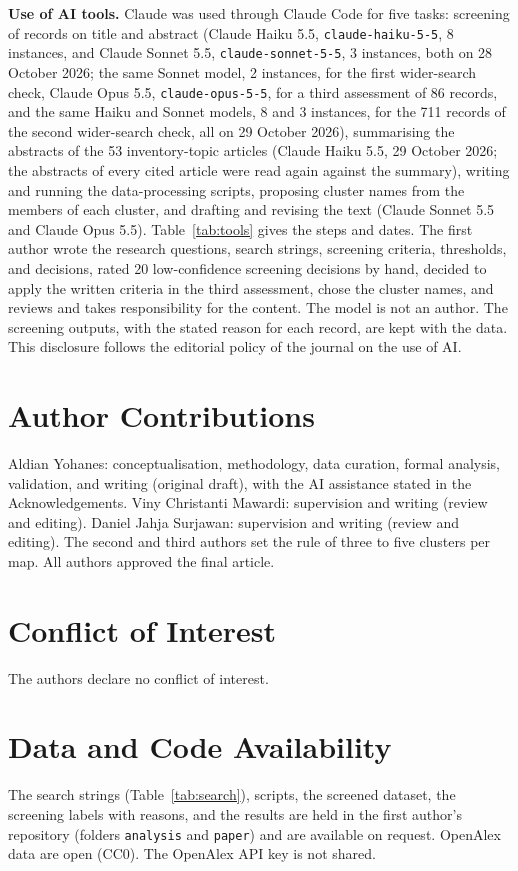 \textbf{Use of AI tools.} Claude \parencite{anthropic2026claude} was used through Claude Code for five tasks: screening of records on title and abstract (Claude Haiku 5.5, \texttt{claude-haiku-5-5}, 8 instances, and Claude Sonnet 5.5, \texttt{claude-sonnet-5-5}, 3 instances, both on 28 October 2026; the same Sonnet model, 2 instances, for the first wider-search check, Claude Opus 5.5, \texttt{claude-opus-5-5}, for a third assessment of 86 records, and the same Haiku and Sonnet models, 8 and 3 instances, for the 711 records of the second wider-search check, all on 29 October 2026), summarising the abstracts of the 53 inventory-topic articles (Claude Haiku 5.5, 29 October 2026; the abstracts of every cited article were read again against the summary), writing and running the data-processing scripts, proposing cluster names from the members of each cluster, and drafting and revising the text (Claude Sonnet 5.5 and Claude Opus 5.5). Table~\ref{tab:tools} gives the steps and dates. The first author wrote the research questions, search strings, screening criteria, thresholds, and decisions, rated 20 low-confidence screening decisions by hand, decided to apply the written criteria in the third assessment, chose the cluster names, and reviews and takes responsibility for the content. The model is not an author. The screening outputs, with the stated reason for each record, are kept with the data. This disclosure follows the editorial policy of the journal on the use of AI.

\section*{Author Contributions}
Aldian Yohanes: conceptualisation, methodology, data curation, formal analysis, validation, and writing (original draft), with the AI assistance stated in the Acknowledgements. Viny Christanti Mawardi: supervision and writing (review and editing). Daniel Jahja Surjawan: supervision and writing (review and editing). The second and third authors set the rule of three to five clusters per map. All authors approved the final article. 

\section*{Conflict of Interest}
The authors declare no conflict of interest.

\section*{Data and Code Availability}
The search strings (Table~\ref{tab:search}), scripts, the screened dataset, the screening labels with reasons, and the results are held in the first author's repository (folders \texttt{analysis} and \texttt{paper}) and are available on request. OpenAlex data are open (CC0). The OpenAlex API key is not shared.

